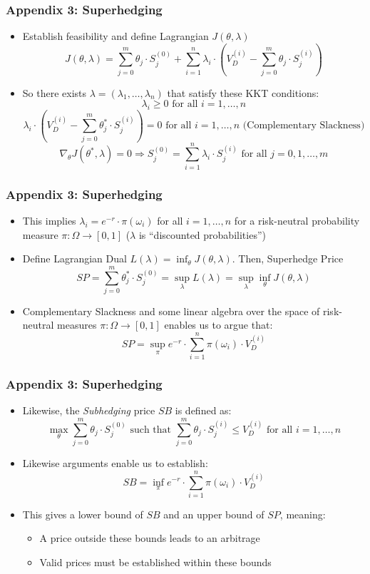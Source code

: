 \documentclass{beamer}
\begin{document}
\begin{frame}
\frametitle{Appendix 3: Superhedging}
\begin{itemize}
\item Establish feasibility and define Lagrangian $J(\theta, \lambda)$
$$J(\theta, \lambda) = \sum_{j=0}^m \theta_j \cdot S_j^{(0)} + \sum_{i=1}^n \lambda_i \cdot (V_D^{(i)} - \sum_{j=0}^m \theta_j \cdot S_j^{(i)})$$
\item So there exists $\lambda = (\lambda_1, \ldots, \lambda_n)$ that satisfy these KKT conditions:
$$\lambda_i \geq 0 \mbox{ for all } i = 1, \ldots, n$$
$$\lambda_i \cdot (V_D^{(i)} - \sum_{j=0}^m \theta_j^* \cdot S_j^{(i)}) = 0 \mbox{ for all } i = 1, \ldots, n \mbox{ (Complementary Slackness)}$$
$$\nabla_{\theta} J(\theta^*, \lambda) = 0 \Rightarrow S_j^{(0)} = \sum_{i=1}^n \lambda_i \cdot S_j^{(i)} \mbox{ for all } j = 0, 1, \ldots, m$$
\end{itemize}
\end{frame}

\begin{frame}
\frametitle{Appendix 3: Superhedging}
\begin{itemize}
\item This implies $\lambda_i = e^{-r} \cdot \pi(\omega_i)$ for all $i = 1, \ldots, n$ for a risk-neutral probability measure $\pi : \Omega \rightarrow [0,1]$ ($\lambda$ is ``discounted probabilities'')
\item Define Lagrangian Dual $L(\lambda) = \inf_{\theta} J(\theta, \lambda)$. Then, Superhedge Price
$$SP = \sum_{j=0}^m \theta_j^* \cdot S_j^{(0)} = \sup_{\lambda} L(\lambda) = \sup_{\lambda} \inf_{\theta} J(\theta, \lambda)$$
\item Complementary Slackness and some linear algebra over the space of risk-neutral measures $\pi : \Omega \rightarrow [0,1]$ enables us to argue that:
$$SP = \sup_{\pi} e^{-r} \cdot \sum_{i=1}^n \pi(\omega_i) \cdot V_D^{(i)}$$
\end{itemize}
\end{frame}

\begin{frame}
\frametitle{Appendix 3: Superhedging}
\begin{itemize}
\item Likewise, the {\em Subhedging} price $SB$ is defined as:
\begin{equation}
\max_{\theta} \sum_{j=0}^m \theta_j \cdot S_j^{(0)} \mbox{ such that } \sum_{j=0}^m \theta_j \cdot S_j^{(i)} \leq V_D^{(i)} \mbox{ for all } i = 1, \ldots, n
\end{equation}
\item Likewise arguments enable us to establish:
$$SB = \inf_{\pi} e^{-r} \cdot \sum_{i=1}^n \pi(\omega_i) \cdot V_D^{(i)}$$
\item This gives a lower bound of $SB$ and an upper bound of $SP$, meaning:
\begin{itemize}
\item A price outside these bounds leads to an arbitrage 
\item Valid prices must be established within these bounds
\end{itemize}
\end{itemize}
\end{frame}
\end{document}
